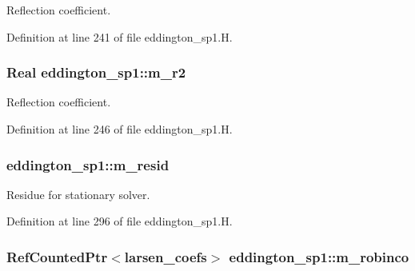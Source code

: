 Reflection coefficient. 



Definition at line 241 of file eddington\+\_\+sp1.\+H.

\subsubsection[{\texorpdfstring{m\+\_\+r2}{m_r2}}]{\setlength{\rightskip}{0pt plus 5cm}Real eddington\+\_\+sp1\+::m\+\_\+r2\hspace{0.3cm}{\ttfamily [protected]}}\hypertarget{classeddington__sp1_aeb2df73bf465a1d00be7f6e574f74759}{}\label{classeddington__sp1_aeb2df73bf465a1d00be7f6e574f74759}


Reflection coefficient. 



Definition at line 246 of file eddington\+\_\+sp1.\+H.

\subsubsection[{\texorpdfstring{m\+\_\+resid}{m_resid}}]{ eddington\+\_\+sp1\+::m\+\_\+resid\hspace{0.3cm}{\ttfamily [protected]}}\hypertarget{classeddington__sp1_a73f58ed4df70505d9153f7a364459018}{}\label{classeddington__sp1_a73f58ed4df70505d9153f7a364459018}


Residue for stationary solver. 



Definition at line 296 of file eddington\+\_\+sp1.\+H.

\subsubsection[{\texorpdfstring{m\+\_\+robinco}{m_robinco}}]{\setlength{\rightskip}{0pt plus 5cm}Ref\+Counted\+Ptr$<${\bf larsen\+\_\+coefs}$>$ eddington\+\_\+sp1\+::m\+\_\+robinco\hspace{0.3cm}{\ttfamily [protected]}}\hypertarget{classeddington__sp1_ae38005aa62215a621122de6426fe2fa2}{}\label{classeddington__sp1_ae38005aa62215a621122de6426fe2fa2}


